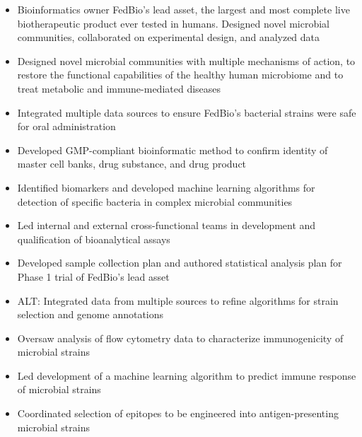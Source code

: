 \documentclass[letterpaper,10pt]{article}
\begin{document}
\begin{itemize}
\begin{itemize}
			\item Bioinformatics owner FedBio's lead asset, the largest and most complete live biotherapeutic product ever tested in humans. Designed novel microbial communities, collaborated on experimental design, and analyzed data
			\item Designed novel microbial communities with multiple mechanisms of action, to restore the functional capabilities of the healthy human microbiome and to treat metabolic and immune-mediated diseases
			\item Integrated multiple data sources to ensure FedBio's bacterial strains were safe for oral administration
			\item Developed GMP-compliant bioinformatic method to confirm identity of master cell banks, drug substance, and drug product
			\item Identified biomarkers and developed machine learning algorithms for detection of specific bacteria in complex microbial communities
			\item Led internal and external cross-functional teams in development and qualification of bioanalytical assays
			\item Developed sample collection plan and authored statistical analysis plan for Phase 1 trial of FedBio's lead asset

			\item ALT: Integrated data from multiple sources to refine algorithms for strain selection and genome annotations
			
			\item Oversaw analysis of flow cytometry data to characterize immunogenicity of microbial strains
			\item Led development of a machine learning algorithm to predict immune response of microbial strains
			\item Coordinated selection of epitopes to be engineered into antigen-presenting microbial strains


\end{itemize}
\end{itemize}
\end{document}
